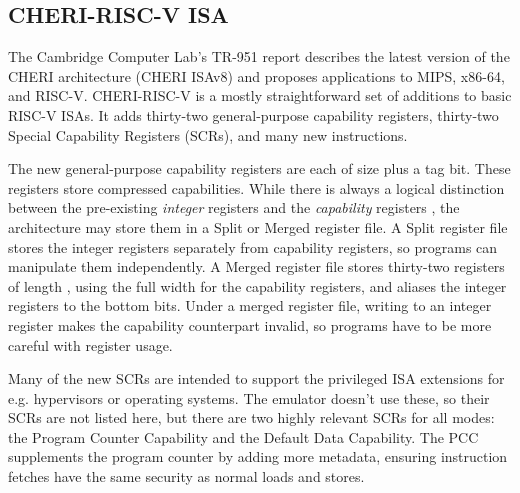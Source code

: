 



\subsection{CHERI-RISC-V ISA}
The Cambridge Computer Lab's TR-951 report describes the latest version of the CHERI architecture (CHERI ISAv8) and proposes applications to MIPS, x86-64, and RISC-V.
CHERI-RISC-V is a mostly straightforward set of additions to basic RISC-V ISAs.
It adds thirty-two general-purpose capability registers, thirty-two Special Capability Registers (SCRs), and many new instructions.

The new general-purpose capability registers are each of size  plus a tag bit.
These registers store compressed capabilities.
While there is always a logical distinction between the pre-existing \emph{integer} registers  and the \emph{capability} registers , the architecture may store them in a Split or Merged register file.
A Split register file stores the integer registers separately from capability registers, so programs can manipulate them independently.
A Merged register file stores thirty-two registers of length , using the full width for the capability registers, and aliases the integer registers to the bottom  bits.
Under a merged register file, writing to an integer register makes the capability counterpart invalid, so programs have to be more careful with register usage.



Many of the new SCRs are intended to support the privileged ISA extensions for e.g. hypervisors or operating systems.
The emulator doesn't use these, so their SCRs are not listed here, but there are two highly relevant SCRs for all modes: the Program Counter Capability and the Default Data Capability.
The PCC supplements  the program counter by adding more metadata, ensuring instruction fetches have the same security as normal loads and stores.


